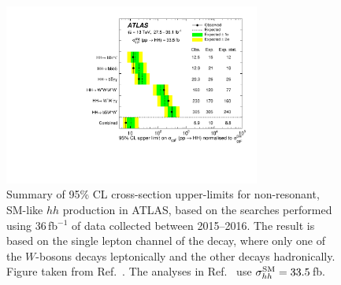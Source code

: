 \begin{figure}[!htb]
    \begin{center}
        \includegraphics[width=0.75\textwidth]{figures/search_hh/hh_intro/hh_comb_36}
        \caption{
            Summary of 95\% CL cross-section upper-limits for non-resonant, SM-like $hh$
            production in ATLAS, based on the searches performed using 36\,fb$^{-1}$ of
            data collected between 2015--2016.
            The \bbww result is based on the single lepton channel of the \bbww decay,
            where only one of the $W$-bosons decays leptonically and the other decays hadronically.
            Figure taken from Ref.~\cite{HHComb36}.
            The analyses in Ref.~\cite{HHComb36} use $\sigma_{hh}^{\text{SM}} = 33.5$\,fb.
        }
        \label{fig:hh_comb_36}
    \end{center}
\end{figure}

%
%
\FloatBarrier

\FloatBarrier




